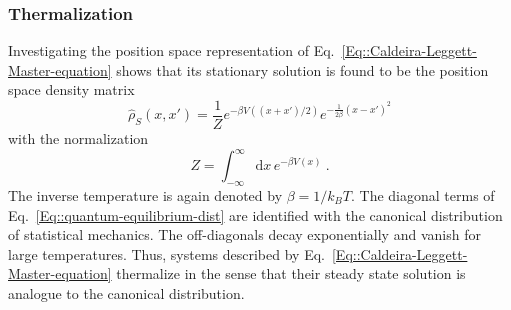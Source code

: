 	\subsubsection{Thermalization}
	Investigating the position space representation of Eq.~\eqref{Eq::Caldeira-Leggett-Master-equation} shows that its stationary solution is found to be the position space density matrix
	\begin{equation} \label{Eq::quantum-equilibrium-dist}
		\hat{\rho}_S (x, x') = \frac{1}{Z}	e^{- \beta {V((x + x') /2)}} e^{-\frac{1}{2\beta} (x - x')^2}
	\end{equation}
	with the normalization
	\begin{equation}
		Z =	\int_{-\infty}^{\infty} \text{d}x\, e^{- \beta {V(x)}}~.
	\end{equation}
	The inverse temperature is again denoted by $\beta =	1 /	k_B T$. The diagonal terms of Eq.~\eqref{Eq::quantum-equilibrium-dist} are identified with the canonical distribution of statistical mechanics. The off-diagonals decay exponentially and vanish for large temperatures. Thus, systems described by Eq.~\eqref{Eq::Caldeira-Leggett-Master-equation} thermalize in the sense that their steady state solution is analogue to the canonical distribution. 
